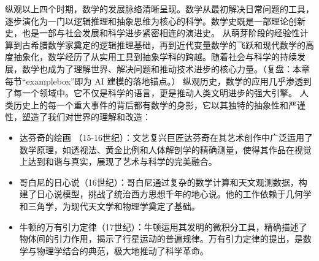 纵观以上四个时期，数学的发展脉络清晰呈现。数学从最初解决日常问题的工具，逐步演化为一门以逻辑推理和抽象思维为核心的科学。数学史既是一部理论创新史，也是一部与社会发展和科学进步紧密相连的演进史。
从萌芽阶段的经验性计算到古希腊数学家奠定的逻辑推理基础，再到近代变量数学的飞跃和现代数学的高度抽象化，数学经历了从实用工具到抽象学科的跨越。随着社会与科学的持续发展，数学也成为了理解世界、解决问题和推动技术进步的核心力量。{（复盘：本章每节“examplebox”即为 AI 建模的落地锚点。）}
纵观历史，数学的应用几乎渗透到了每一个领域中。它不仅是科学的语言，更是推动人类文明进步的强大引擎。
人类历史上的每一个重大事件的背后都有数学的身影，它以其独特的抽象性和严谨性，塑造了我们对世界的理解和改造：
\begin{itemize}
\item 达芬奇的绘画 （15-16世纪）：文艺复兴巨匠达芬奇在其艺术创作中广泛运用了数学原理，如透视法、黄金比例和人体解剖学的精确测量，使得其作品在视觉上达到和谐与真实，展现了艺术与科学的完美融合。
\item 哥白尼的日心说（16世纪）：哥白尼通过复杂的数学计算和天文观测数据，构建了日心说模型，挑战了统治西方思想千年的地心说。他的工作依赖于几何学和三角学，为现代天文学和物理学奠定了基础。
\item 牛顿的万有引力定律（17世纪）：牛顿运用其发明的微积分工具，精确描述了物体间的引力作用，揭示了行星运动的普遍规律。万有引力定律的提出，是数学与物理学结合的典范，极大地推动了科学革命。



\end{itemize}
